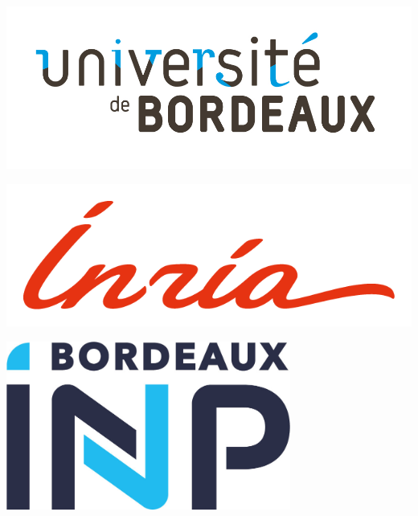 \newcommand{\BXexam}[5]{#1 \textsc{#2} \dotfill & #3, #4 \dotfill & #5 \\}


\pagestyle{empty}

\begin{titlepage}
    \begin{center}

        \vspace*{-96pt}

        \begin{minipage}[c]{0.3\textwidth}
            \centering
            \includegraphics[width=\textwidth]{images/cover/logo-ub.jpg}
        \end{minipage}
        \hfill
        \begin{minipage}[c]{0.2\textwidth}
            \centering
            \includegraphics[width=\textwidth]{images/cover/logo-inria.png}
        \end{minipage}
        \hfill
        \begin{minipage}[c]{0.2\textwidth}
            \centering
            \includegraphics[width=0.7\textwidth]{images/cover/logo-bdxinp.jpg}
        \end{minipage}
        \vfill
        \vfill
        \vfill
        \vfill


\end{center}
\end{titlepage}
